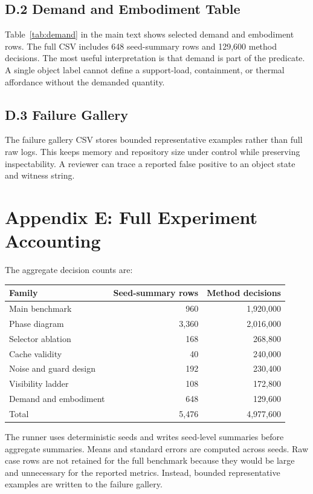 \documentclass{article}
\begin{document}
\subsection{D.2 Demand and Embodiment Table}

Table~\ref{tab:demand} in the main text shows selected demand and embodiment
rows.  The full CSV includes 648 seed-summary rows and 129,600 method decisions.
The most useful interpretation is that demand is part of the predicate.  A
single object label cannot define a support-load, containment, or thermal
affordance without the demanded quantity.

\subsection{D.3 Failure Gallery}

The failure gallery CSV stores bounded representative examples rather than full
raw logs.  This keeps memory and repository size under control while preserving
inspectability.  A reviewer can trace a reported false positive to an object
state and witness string.

\section{Appendix E: Full Experiment Accounting}

The aggregate decision counts are:

\begin{center}
\begin{tabular}{lrr}
\toprule
Family & Seed-summary rows & Method decisions \\
\midrule
Main benchmark & 960 & 1,920,000 \\
Phase diagram & 3,360 & 2,016,000 \\
Selector ablation & 168 & 268,800 \\
Cache validity & 40 & 240,000 \\
Noise and guard design & 192 & 230,400 \\
Visibility ladder & 108 & 172,800 \\
Demand and embodiment & 648 & 129,600 \\
\midrule
Total & 5,476 & 4,977,600 \\
\bottomrule
\end{tabular}
\end{center}

The runner uses deterministic seeds and writes seed-level summaries before
aggregate summaries.  Means and standard errors are computed across seeds.  Raw
case rows are not retained for the full benchmark because they would be large
and unnecessary for the reported metrics.  Instead, bounded representative
examples are written to the failure gallery.
\end{document}
